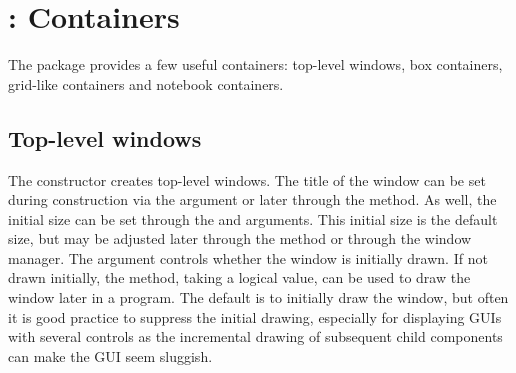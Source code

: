 \chapter{: Containers}
\label{sec:gWidgets-Containers}



The  package provides a few useful containers: top-level
windows, box containers, grid-like containers and notebook containers.

\section{Top-level windows}
\label{sec:gWidgets-top-level-windows}

The  constructor creates top-level windows. The
title of the window can be set during construction via the
 argument or later through the
 method. As well, the initial size can be set
through the  and 
arguments. This initial size is the default size, but may be adjusted
later through the  method or through the window
manager. The  argument controls whether the
window is initially drawn. If not drawn initially, the
 method, taking a logical value, can
be used to draw the window later in a program.  The default is to
initially draw the window, but often it is good practice to suppress
the initial drawing, especially for displaying GUIs with several
controls as the incremental drawing of subsequent child components can
make the GUI seem sluggish.

